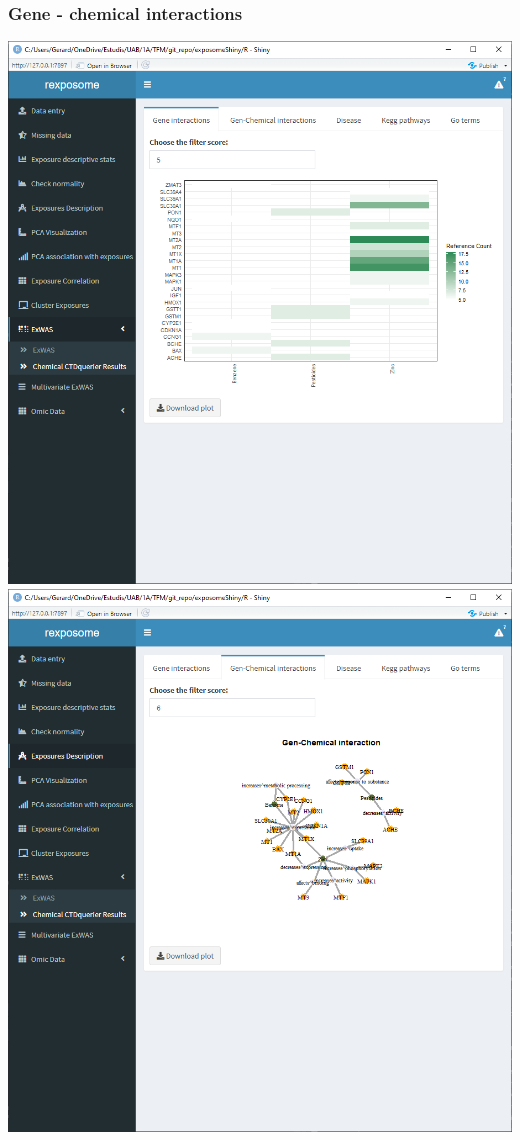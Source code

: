 \documentclass[
]{book}
\begin{document}
\hypertarget{gene---chemical-interactions}{%
\subsubsection{Gene - chemical interactions}\label{gene---chemical-interactions}}

\includegraphics{images/analysis7_4_3.png}
\includegraphics{images/analysis7_4_4.png}
\end{document}
